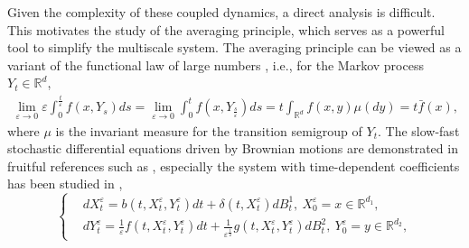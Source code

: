 \documentclass[11pt,reqno]{amsart}
\numberwithin{equation}{section}
\newcommand{\R}{\mathbb{R}}
\begin{document}
 
Given the complexity of these coupled dynamics, a direct analysis is 
difficult. This motivates the study of the averaging principle, which serves as a powerful tool to simplify the multiscale system.
The averaging principle can be viewed as a variant of the  functional law of large numbers \cite{RX2}, i.e., for the Markov process $Y_{t}\in\R^d$,
\begin{align*}
\lim_{\varepsilon\rightarrow0}\varepsilon\int_{0}^{\frac{t}{\varepsilon}}f(x,Y_{s})ds=\lim_{\varepsilon\rightarrow0}\int_{0}^{t}f(x,Y_{\frac{s}{\varepsilon}})ds=t\int_{\R^d} f(x,y)\mu(dy)=t\bar{f}(x),
\end{align*}
where $\mu$ is the invariant measure for the transition
semigroup of $Y_{t}$.
The slow-fast stochastic differential equations driven by Brownian motions are demonstrated in fruitful  references such as \cite{RZK,RX,AYV}, especially the system with time-dependent coefficients has been studied in \cite{LRSX},
\begin{equation}\label{1}
	\left\{
	\begin{aligned}
		& dX_{t}^{\varepsilon}=b(t,X_{t}^{\varepsilon},Y_{t}^{\varepsilon})dt+\delta(t,X_{t}^{\varepsilon})dB^{1}_{t},\ X^{\varepsilon}_{0}=x\in \mathbb{R}^{d_{1} },\\
		&dY_{t}^{\varepsilon}=\frac{1}{\varepsilon}f(t,X_{t}^{\varepsilon},Y_{t}^{\varepsilon})dt+\frac{1}{\varepsilon^{\frac{1}{2}}}g(t,X_{t}^{\varepsilon},Y_{t}^{\varepsilon})dB^{2}_{t},\ Y^{\varepsilon}_{0}=y\in \mathbb{R}^{d_{2}},
	\end{aligned}
	\right.
\end{equation}
\end{document}

